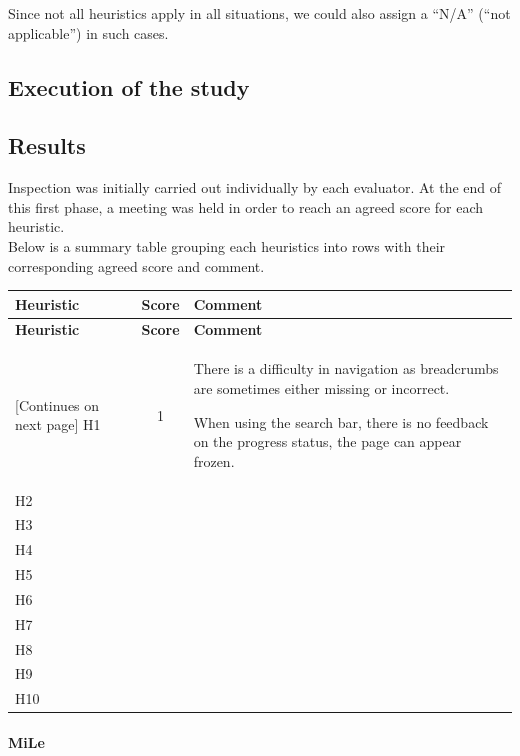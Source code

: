 Since not all heuristics apply in all situations, we could also assign a ``N/A'' (``not applicable'') in such cases.

\subsection{Execution of the study}

\pagebreak

\subsection{Results}
Inspection was initially carried out individually by each evaluator. At the end of this first phase, a meeting was held in order to reach an agreed score for each heuristic.\\
Below is a summary table grouping each heuristics into rows with their corresponding agreed score and comment.

\begin{tabularx}{\linewidth}{l c X}
\toprule
\textbf{Heuristic} & \textbf{Score} & \textbf{Comment} \\
\midrule
\endfirsthead
\toprule
\textbf{Heuristic} & \textbf{Score} & \textbf{Comment} \\
\midrule
\endhead
\midrule
\footnotesize [Continues on next page]
\endfoot
\bottomrule
\endlastfoot
    H1 & 1 & There is a difficulty in navigation as breadcrumbs are sometimes either missing or incorrect.\par When using the search bar, there is no feedback on the progress status, the page can appear frozen. \\ \midrule
    H2 &  & \\ \midrule
    H3 &  & \\ \midrule
    H4 &  & \\ \midrule
    H5 &  & \\ \midrule
    H6 &  & \\ \midrule
    H7 &  & \\ \midrule
    H8 &  & \\ \midrule
    H9 &  & \\ \midrule
    H10 &  &
\end{tabularx}

\paragraph{MiLe}

